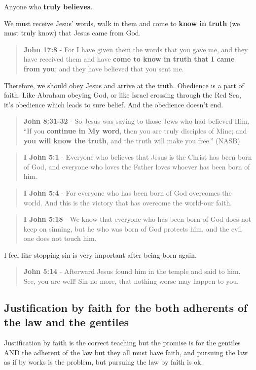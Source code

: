 \documentclass[11pt]{article}
\begin{document}
Anyone who \textbf{truly believes}.

We must receive Jesus' words, walk in them and come to \textbf{know in truth} (we must truly know) that Jesus came from God.

\begin{quote}
\textbf{John 17:8} - For I have given them the words that you gave me, and they have received them and have \textbf{come to know in truth that I came from you}; and they have believed that you sent me.
\end{quote}

Therefore, we should obey Jesus and arrive at the truth. Obedience is a part of faith. Like Abraham obeying God, or like Israel crossing through the Red Sea, it's obedience which leads to sure belief.
And the obedience doesn't end.

\begin{quote}
\textbf{John 8:31-32} - So Jesus was saying to those Jews who had believed Him, “If you \textbf{continue in My word}, then you are truly disciples of Mine; and \textbf{you will know the truth}, and the truth will make you free.” (NASB)
\end{quote}

\begin{quote}
\textbf{I John 5:1} - Everyone who believes that Jesus is the Christ has been born of God, and everyone who loves the Father loves whoever has been born of him.
\end{quote}

\begin{quote}
\textbf{I John 5:4} - For everyone who has been born of God overcomes the world. And this is the victory that has overcome the world-our faith.
\end{quote}

\begin{quote}
\textbf{I John 5:18} - We know that everyone who has been born of God does not keep on sinning, but he who was born of God protects him, and the evil one does not touch him.
\end{quote}

I feel like stopping sin is very important after being born again.

\begin{quote}
\textbf{John 5:14} - Afterward Jesus found him in the temple and said to him, See, you are well! Sin no more, that nothing worse may happen to you.
\end{quote}

\subsection{Justification by faith for the both adherents of the law and the gentiles}
\label{sec:orgdf967d5}
Justification by faith is the correct teaching but the promise is for the gentiles AND the adherent of the law but they all must have faith, and pursuing the law as if by works is the problem, but pursuing the law by faith is ok.
\end{document}
